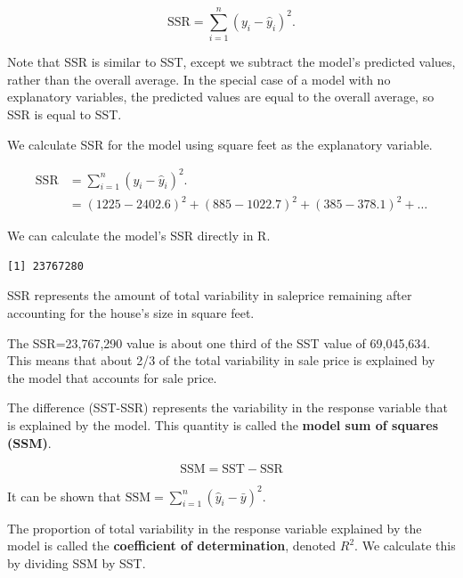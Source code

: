 \documentclass[
  letterpaper,
  DIV=11,
  numbers=noendperiod]{scrreprt}
\newenvironment{Shaded}{\begin{snugshade}}{\end{snugshade}}
\newcommand{\DecValTok}[1]{\textcolor[rgb]{0.68,0.00,0.00}{#1}}
\newcommand{\FunctionTok}[1]{\textcolor[rgb]{0.28,0.35,0.67}{#1}}
\newcommand{\NormalTok}[1]{\textcolor[rgb]{0.00,0.23,0.31}{#1}}
\newcommand{\OtherTok}[1]{\textcolor[rgb]{0.00,0.23,0.31}{#1}}
\newcommand{\SpecialCharTok}[1]{\textcolor[rgb]{0.37,0.37,0.37}{#1}}
\begin{document}
\[
\text{SSR} = \displaystyle\sum_{i=1}^{n}(y_i-\hat{y}_i)^2.  
\]

Note that SSR is similar to SST, except we subtract the model's
predicted values, rather than the overall average. In the special case
of a model with no explanatory variables, the predicted values are equal
to the overall average, so SSR is equal to SST.

We calculate SSR for the model using square feet as the explanatory
variable.

\[
\begin{aligned}
\text{SSR} & = \displaystyle\sum_{i=1}^{n}(y_i-\hat{y}_i)^2.  \\
 & = (1225 - 2402.6)^2 + (885 - 1022.7)^2 + (385 - 378.1)^2 + \ldots
\end{aligned}
\]

We can calculate the model's SSR directly in R.

\begin{Shaded}
\end{Shaded}

\begin{verbatim}
[1] 23767280
\end{verbatim}

SSR represents the amount of total variability in saleprice remaining
after accounting for the house's size in square feet.

The SSR=23,767,290 value is about one third of the SST value of
69,045,634. This means that about 2/3 of the total variability in sale
price is explained by the model that accounts for sale price.

The difference (SST-SSR) represents the variability in the response
variable that is explained by the model. This quantity is called the
\textbf{model sum of squares (SSM)}.

\[ \text{SSM} = \text{SST} - \text{SSR} \]

It can be shown that
\(\text{SSM}=\displaystyle\sum_{i=1}^n(\hat{y}_i-\bar{y})^2\).

The proportion of total variability in the response variable explained
by the model is called the \textbf{coefficient of determination},
denoted \(R^2\). We calculate this by dividing SSM by SST.
\end{document}
